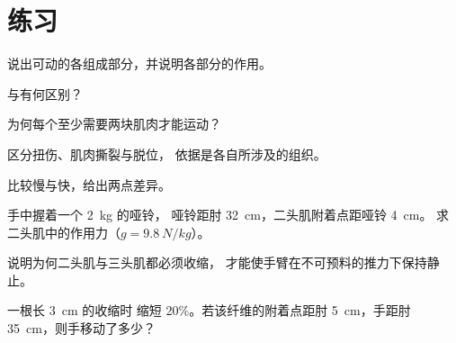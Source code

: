 \section{练习}

\begin{exercise}[$\star$]\label{exo:g10:muscles-and-joints:1}
说出可动的各组成部分，并说明各部分的作用。
\end{exercise}

\begin{exercise}[$\star$]\label{exo:g10:muscles-and-joints:2}
与有何区别？
\end{exercise}

\begin{exercise}[$\star$]\label{exo:g10:muscles-and-joints:3}
为何每个至少需要两块肌肉才能运动？
\end{exercise}

\begin{exercise}[$\star$]\label{exo:g10:muscles-and-joints:4}
区分扭伤、肌肉撕裂与脱位，
依据是各自所涉及的组织。
\end{exercise}

\begin{exercise}[$\star$]\label{exo:g10:muscles-and-joints:5}
比较慢与快，给出两点差异。
\end{exercise}

\begin{exercise}[$\star\star$]\label{exo:g10:muscles-and-joints:6}
手中握着一个 \qty{2}{kg} 的哑铃，
哑铃距肘 \qty{32}{cm}，二头肌附着点距哑铃 \qty{4}{cm}。
求二头肌中的作用力（$g = \qty{9.8}{N/kg}$）。
\end{exercise}

\begin{exercise}[$\star\star$]\label{exo:g10:muscles-and-joints:7}
说明为何二头肌与三头肌都必须收缩，
才能使手臂在不可预料的推力下保持静止。
\end{exercise}

\begin{exercise}[$\star\star$]\label{exo:g10:muscles-and-joints:8}
一根长 \qty{3}{cm} 的收缩时
缩短 20\%。若该纤维的附着点距肘
\qty{5}{cm}，手距肘 \qty{35}{cm}，则手移动了多少？
\end{exercise}

